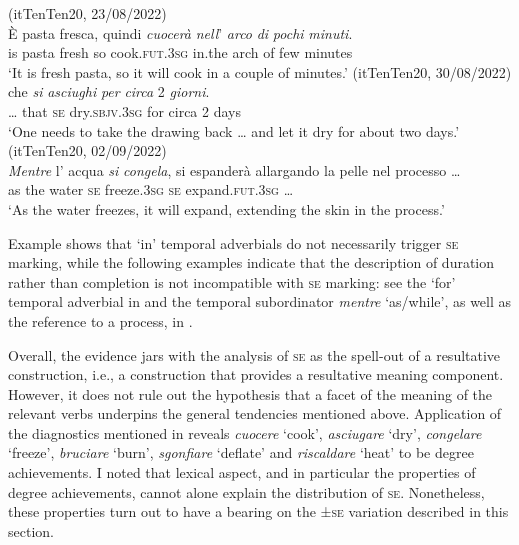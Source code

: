 \documentclass[output=paper,colorlinks,citecolor=brown
]{langscibook}
\begin{document}
\ea \label{bentley_example_26}(itTenTen20, 23/08/2022)\\
    \gll È	pasta	fresca,	quindi \textit{cuocerà} 					\textit{nell}’			\textit{arco}		\textit{di}	 	\textit{pochi} \textit{minuti}. \\
    		is	pasta	fresh		so					cook.\textsc{fut}.3\textsc{sg}	in.the		arch		of		few		minutes \\
    \glt ‘It is fresh pasta, so it will cook in a couple of minutes.’
\ex \label{bentley_example_27}(itTenTen20, 30/08/2022)\\
      che		\textit{si}		\textit{asciughi}					\textit{per}		\textit{circa}	2	\textit{giorni}. \\
    	{\ldots} 		that	\textsc{se}		dry.\textsc{sbjv}.3\textsc{sg}		for		circa	2	days \\
    \glt	‘One needs to take the drawing back \ldots{}  and let it dry for about two days.’
\ex \label{bentley_example_28}(itTenTen20, 02/09/2022)\\
    \gll \textit{Mentre}	l’		acqua		\textit{si}     \textit{congela},			si		espanderà {allargando la pelle   nel processo \ldots}\\
    	as						the	water		\textsc{se}		freeze.3\textsc{sg}		\textsc{se}		expand.\textsc{fut}.3\textsc{sg} {\ldots} \\
    \glt 	‘As the water freezes, it will expand, extending the skin in the process.’
\z

Example  shows that ‘in’ temporal adverbials do not necessarily trigger \textsc{se} marking, while the following examples indicate that the description of duration rather than completion is not incompatible with \textsc{se} marking: see the ‘for’ temporal adverbial in  and the temporal subordinator \textit{mentre} ‘as/while’, as well as the reference to a process, in . 

Overall, the evidence jars with the analysis of \textsc{se} as the spell-out of a resultative construction, i.e., a construction that provides a resultative meaning component. However, it does not rule out the hypothesis that a facet of the meaning of the relevant verbs underpins the general tendencies mentioned above. Application of the diagnostics mentioned in  reveals \textit{cuocere} ‘cook’, \textit{asciugare} ‘dry’, \textit{congelare} ‘freeze’, \textit{bruciare} ‘burn’, \textit{sgonfiare} ‘deflate’ and \textit{riscaldare} ‘heat’ to be degree achievements. I noted that lexical aspect, and in particular the properties of degree achievements, cannot alone explain the distribution of \textsc{se}. Nonetheless, these properties turn out to have a bearing on the ±\textsc{se} variation described in this section. 
\end{document}
